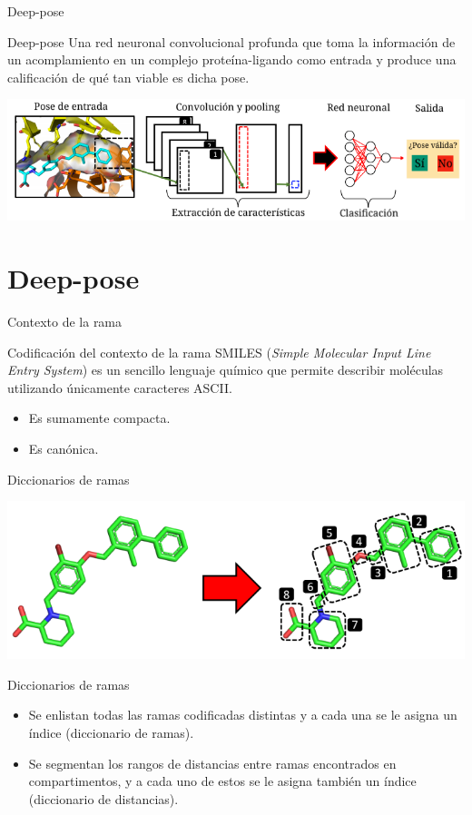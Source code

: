 \documentclass[presentation]{beamer}
\begin{document}
\begin{frame}[label={sec:org858f579}]{Deep-pose}
\begin{block}{Deep-pose}
Una red neuronal convolucional profunda que toma la información de
un acomplamiento en un complejo proteína-ligando como entrada y
produce una calificación de qué tan viable es dicha pose.
\begin{center}
\includegraphics[width=.9\linewidth]{images/architecture.png}
\end{center}
\end{block}
\end{frame}
\section{Deep-pose}
\label{sec:orgf3e7538}
\begin{frame}[label={sec:org6ca578b}]{Contexto de la rama}
\pause
\begin{block}{Codificación del contexto de la rama}
SMILES (\emph{Simple Molecular Input Line Entry System}) es un sencillo
lenguaje químico que permite describir moléculas utilizando únicamente
caracteres ASCII.
\pause
\begin{itemize}
\item Es sumamente compacta.
\pause
\item Es canónica.
\end{itemize}
\end{block}
\end{frame}
\begin{frame}[label={sec:org200f255}]{Diccionarios de ramas}
\pause
\begin{center}
\includegraphics[width=.9\linewidth]{images/branches.png}
\end{center}
\pause
\begin{block}{Diccionarios de ramas}
\begin{itemize}
\item Se enlistan todas las ramas codificadas distintas y a cada una se
le asigna un índice (\alert{diccionario de ramas}).
\item Se segmentan los rangos de distancias entre ramas encontrados
en compartimentos, y a cada uno de estos se le asigna también un
índice (\alert{diccionario de distancias}).
\end{itemize}
\end{block}
\end{frame}
\end{document}
